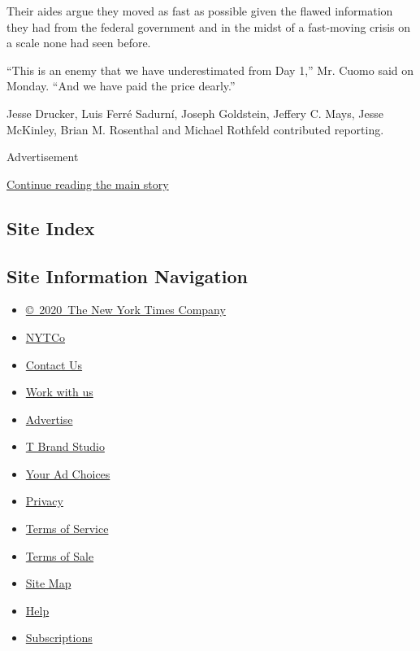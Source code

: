 Their aides argue they moved as fast as possible given the flawed
information they had from the federal government and in the midst of a
fast-moving crisis on a scale none had seen before.

``This is an enemy that we have underestimated from Day 1,'' Mr. Cuomo
said on Monday. ``And we have paid the price dearly.''

Jesse Drucker, Luis Ferré Sadurní, Joseph Goldstein, Jeffery C. Mays,
Jesse McKinley, Brian M. Rosenthal and Michael Rothfeld contributed
reporting.

Advertisement

\protect\hyperlink{after-bottom}{Continue reading the main story}

\hypertarget{site-index}{%
\subsection{Site Index}\label{site-index}}

\hypertarget{site-information-navigation}{%
\subsection{Site Information
Navigation}\label{site-information-navigation}}

\begin{itemize}
\tightlist
\item
  \href{https://help.nytimes3xbfgragh.onion/hc/en-us/articles/115014792127-Copyright-notice}{©~2020~The
  New York Times Company}
\end{itemize}

\begin{itemize}
\tightlist
\item
  \href{https://www.nytco.com/}{NYTCo}
\item
  \href{https://help.nytimes3xbfgragh.onion/hc/en-us/articles/115015385887-Contact-Us}{Contact
  Us}
\item
  \href{https://www.nytco.com/careers/}{Work with us}
\item
  \href{https://nytmediakit.com/}{Advertise}
\item
  \href{http://www.tbrandstudio.com/}{T Brand Studio}
\item
  \href{https://www.nytimes3xbfgragh.onion/privacy/cookie-policy\#how-do-i-manage-trackers}{Your
  Ad Choices}
\item
  \href{https://www.nytimes3xbfgragh.onion/privacy}{Privacy}
\item
  \href{https://help.nytimes3xbfgragh.onion/hc/en-us/articles/115014893428-Terms-of-service}{Terms
  of Service}
\item
  \href{https://help.nytimes3xbfgragh.onion/hc/en-us/articles/115014893968-Terms-of-sale}{Terms
  of Sale}
\item
  \href{https://spiderbites.nytimes3xbfgragh.onion}{Site Map}
\item
  \href{https://help.nytimes3xbfgragh.onion/hc/en-us}{Help}
\item
  \href{https://www.nytimes3xbfgragh.onion/subscription?campaignId=37WXW}{Subscriptions}
\end{itemize}

